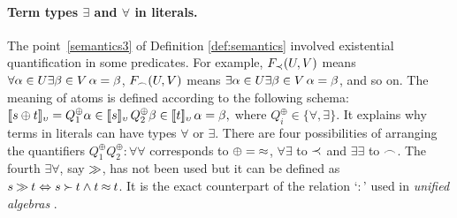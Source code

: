 \paragraph{Term types $\exists$ and $\forall$ in literals.\ }
The point~\ref {semantics3} of Definition \ref{def:semantics} involved
existential quantification in some predicates. For example,
\(F_{\mathbin{\prec}}(U,V)\) means \(\forall\alpha\in U\/ \exists \beta\in V\,
\alpha=\beta\),  \(F_{\mathbin{\frown}}(U,V)\) means
\(\exists\alpha\in U\/ \exists \beta\in V\, \alpha=\beta\), and so on.
The meaning of atoms is defined according to the following schema:
$[\![s\oplus t]\!]_{\upsilon} = Q^\oplus_1 \alpha\in [\![s]\!]_{\upsilon}\, Q^\oplus_2\beta \in
[\![t]\!]_{\upsilon}\, \alpha = \beta,$ where \(Q^\oplus_i\in \{\forall ,\exists \}\).
It explains why terms
in literals can have types $\forall$ or $\exists$.
%
There are four possibilities of arranging the quantifiers $Q_1^\oplus Q_2^\oplus :
\forall\forall$ corresponds to $\oplus=\mathbin{\approx}$, $\forall\exists$ to $\mathbin{\prec}$ and
$\exists\exists$ to $\mathbin{\frown}$. 
 The fourth $\exists\forall$, say $\mathbin{\gg}$, has not been used but it can be
defined as $s\mathbin{\gg} t\Leftrightarrow s\mathbin{\succ} t\land t\mathbin{\approx} t$.
It is the exact counterpart of the relation `$:$' used in {\em unified algebras} 
\cite {uni-al}.
%
%
%
